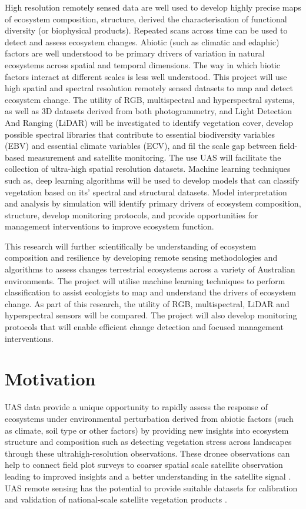 High resolution remotely sensed data are well used to develop highly precise maps of ecosystem composition, 
structure, derived the characterisation of functional diversity (or biophysical products). Repeated scans 
across time can be used to detect and assess ecosystem changes. Abiotic (such as climatic and edaphic) 
factors are well understood to be primary drivers of variation in natural ecosystems across spatial and 
temporal dimensions. The way in which biotic factors interact at different scales is less well understood. 
This project will use high spatial and spectral resolution remotely sensed datasets to map and detect 
ecosystem change. The utility of RGB, multispectral and hyperspectral systems, as well as 3D datasets 
derived from both photogrammetry, and Light Detection And Ranging (LiDAR) will be investigated to identify 
vegetation cover, develop possible spectral libraries that contribute to essential biodiversity variables 
(EBV) and essential climate variables (ECV), and fil the scale gap between field-based measurement and 
satellite monitoring. The use UAS will facilitate the collection of ultra-high spatial resolution datasets. 
Machine learning techniques such as, deep learning algorithms will be used to develop models that can 
classify vegetation based on its’ spectral and structural datasets. Model interpretation and analysis by 
simulation will identify primary drivers of ecosystem composition, structure, develop monitoring protocols, 
and provide opportunities for management interventions to improve ecosystem function.

This research will further scientifically be understanding of ecosystem composition and resilience by 
developing remote sensing methodologies and algorithms to assess changes terrestrial ecosystems across a 
variety of Australian environments. The project will utilise machine learning techniques to perform 
classification to assist ecologists to map and understand the drivers of ecosystem change. As part of this 
research, the utility of RGB, multispectral, LiDAR and hyperspectral sensors will be compared. The project
will also develop monitoring protocols that will enable efficient change detection
and focused management interventions.


\section{Motivation}
UAS data provide a unique opportunity to rapidly assess the response of ecosystems under 
environmental perturbation derived from abiotic factors (such as climate, soil type or other factors) 
by providing new insights into ecosystem structure and composition such as detecting vegetation stress 
across landscapes through these ultrahigh-resolution observations. These dronee observations can help to
connect field plot surveys to coarser spatial scale satellite observation leading to improved insights 
and a better understanding in the satellite signal \citep{lucieer2014Using, melvilleUltrahighSpatialResolution2019}. 
UAS remote sensing has the potential to provide suitable datasets for calibration and validation of 
national-scale satellite vegetation products \citep{fiskComparisonHyperspectralTraditional2019}.

